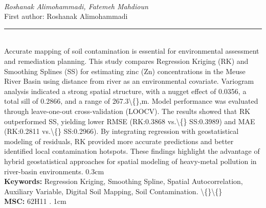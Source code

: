\documentclass[10pt,twoside]{article}
\begin{document}
\noindent\begin{minipage}[t][\textheight]{\textwidth}
\\[0.35em]
{\itshape Roshanak Alimohammadi, Fatemeh Mahdioun}\\[0.2em]
{\footnotesize First author: Roshanak Alimohammadi}\\[0.45em]
\noindent\rule{\textwidth}{0.3pt}\\[0.4em]
{\footnotesize Accurate mapping of soil contamination is essential for environmental assessment and remediation planning. This study compares Regression Kriging (RK) and Smoothing Splines (SS) for estimating zinc (Zn) concentrations in the Meuse River Basin using distance from river as an environmental covariate. Variogram analysis indicated a strong spatial structure, with a nugget effect of 0.0356, a total sill of 0.2866, and a range of 267.3\textbackslash\{\},m. Model performance was evaluated through leave-one-out cross-validation (LOOCV). The results showed that RK outperformed SS, yielding lower RMSE (RK:0.3868 vs.\textbackslash\{\} SS:0.3989) and MAE (RK:0.2811 vs.\textbackslash\{\} SS:0.2966). By integrating regression with geostatistical modeling of residuals, RK provided more accurate predictions and better identified local contamination hotspots. These findings highlight the advantage of hybrid geostatistical approaches for spatial modeling of heavy-metal pollution in river-basin environments. 0.3cm}\\[0.4em]
{\footnotesize\bfseries Keywords:} {\footnotesize Regression Kriging, Smoothing Spline, Spatial Autocorrelation, Auxiliary Variable, Digital Soil Mapping, Soil Contamination. \textbackslash\{\}\textbackslash\{\}}\\[0.15em]
{\footnotesize\bfseries MSC:} {\footnotesize 62H11 . 1cm}\\
\vfill
\end{minipage}
\newpage
\end{document}
